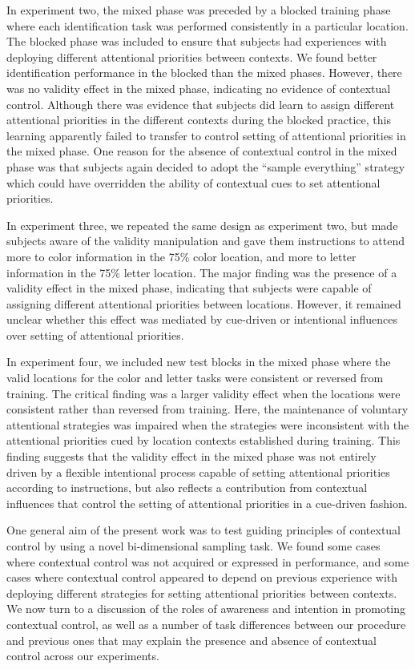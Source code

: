 \documentclass[english,,man,floatsintext]{apa6}
\begin{document}
In experiment two, the mixed phase was preceded by a blocked training
phase where each identification task was performed consistently in a
particular location. The blocked phase was included to ensure that
subjects had experiences with deploying different attentional priorities
between contexts. We found better identification performance in the
blocked than the mixed phases. However, there was no validity effect in
the mixed phase, indicating no evidence of contextual control. Although
there was evidence that subjects did learn to assign different
attentional priorities in the different contexts during the blocked
practice, this learning apparently failed to transfer to control setting
of attentional priorities in the mixed phase. One reason for the absence
of contextual control in the mixed phase was that subjects again decided
to adopt the \enquote{sample everything} strategy which could have
overridden the ability of contextual cues to set attentional priorities.

In experiment three, we repeated the same design as experiment two, but
made subjects aware of the validity manipulation and gave them
instructions to attend more to color information in the 75\% color
location, and more to letter information in the 75\% letter location.
The major finding was the presence of a validity effect in the mixed
phase, indicating that subjects were capable of assigning different
attentional priorities between locations. However, it remained unclear
whether this effect was mediated by cue-driven or intentional influences
over setting of attentional priorities.

In experiment four, we included new test blocks in the mixed phase where
the valid locations for the color and letter tasks were consistent or
reversed from training. The critical finding was a larger validity
effect when the locations were consistent rather than reversed from
training. Here, the maintenance of voluntary attentional strategies was
impaired when the strategies were inconsistent with the attentional
priorities cued by location contexts established during training. This
finding suggests that the validity effect in the mixed phase was not
entirely driven by a flexible intentional process capable of setting
attentional priorities according to instructions, but also reflects a
contribution from contextual influences that control the setting of
attentional priorities in a cue-driven fashion.

One general aim of the present work was to test guiding principles of
contextual control by using a novel bi-dimensional sampling task. We
found some cases where contextual control was not acquired or expressed
in performance, and some cases where contextual control appeared to
depend on previous experience with deploying different strategies for
setting attentional priorities between contexts. We now turn to a
discussion of the roles of awareness and intention in promoting
contextual control, as well as a number of task differences between our
procedure and previous ones that may explain the presence and absence of
contextual control across our experiments.
\end{document}
